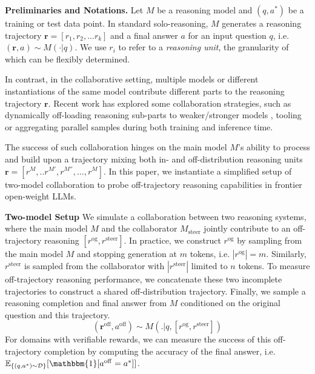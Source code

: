 \documentclass{article} %
\providecommand{\DIFaddtex}[1]{{\protect\color{blue}\uwave{#1}}} %
\providecommand{\DIFaddbegin}{} %
\providecommand{\DIFaddend}{} %
\providecommand{\DIFadd}[1]{\texorpdfstring{\DIFaddtex{#1}}{#1}} %
\newcommand{\DIFaddincludegraphics}[2][]{{\color{blue}\fbox{\DIFOincludegraphics[#1]{#2}}}} %
\DeclareRobustCommand{\DIFaddbegin}{\DIFOaddbegin \let\includegraphics\DIFaddincludegraphics} %
\DeclareRobustCommand{\DIFaddend}{\DIFOaddend \let\includegraphics\DIFOincludegraphics} %
\begin{document}
\textbf{Preliminaries and Notations.} Let $M$ be a reasoning model and $(q, a^{*})$ be a training or test data point. In standard solo-reasoning, $M$ generates a reasoning trajectory $\mathbf{r} = [r_1, r_2, ... r_k]$ and a final answer $a$ for an input question $q$, i.e. $(\mathbf{r}, a) \sim M(\cdot|q)$. We use $r_i$ to refer to a \textit{reasoning unit}, the granularity of which can be flexibly determined. 

In contrast, in the collaborative setting, multiple models or different instantiations of the same model contribute different parts to the reasoning trajectory $\mathbf{r}$. Recent work has explored some collaboration strategies, such as dynamically off-loading reasoning sub-parts to weaker/stronger models \citep{yan2025learning, zhou2025expo,akhauri2025splitreason}, tooling \citep{jin2025search} or aggregating parallel samples \citep{zhao2025majority, qi2025learning} during both training and inference time.


The success of such collaboration hinges on the main model $M$'s ability to process and build upon a trajectory mixing both in- and off-distribution reasoning units $\mathbf{r} = [r^{M}, .. r^{M'}, r^{M''},\ldots, r^{M}]$.  In this paper, we instantiate a simplified setup of two-model collaboration to probe off-trajectory reasoning capabilities in frontier open-weight LLMs.

\textbf{Two-model Setup\DIFaddbegin \DIFadd{.}\DIFaddend } We simulate a collaboration between two reasoning systems, where the main model $M$ and the collaborator $M_\mathrm{steer}$ jointly contribute to an off-trajectory reasoning $[r^\mathrm{og}, r^\mathrm{steer}]$. In practice, we construct $r^\mathrm{og}$ by sampling from the main model $M$ and stopping generation at $m$ tokens, i.e. $|r^\mathrm{og}| = m$. Similarly, $r^\mathrm{steer}$ is sampled from the collaborator with $|r^\mathrm{steer}| $ limited to $ n$ tokens. To measure off-trajectory reasoning performance, we concatenate these two incomplete trajectories to construct a shared off-distribution trajectory. Finally, we sample a reasoning completion and final answer from $M$ conditioned on the original question and this trajectory.
\begin{equation*}
    (\mathbf{r}^\mathrm{off}, a^\mathrm{off}) \sim M(. | q,  [r^\mathrm{og}, r^\mathrm{steer}])
\end{equation*} 
For domains with verifiable rewards, we can measure the success of this off-trajectory completion by computing the accuracy of the final answer, i.e. $\mathbb{E}_{\{(q, a^{*}) \sim \mathcal{D} \}}[\mathbbm{1}[a^\mathrm{off} =a^*]]$. 
\end{document}
